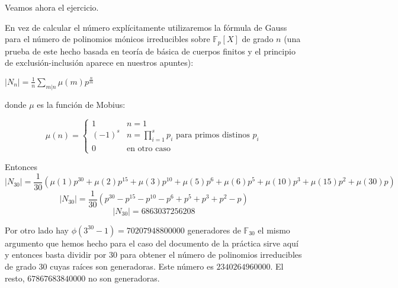 \documentclass{article}
\theoremstyle{theorem-style}  %
\theoremstyle{definition-style}
\theoremstyle{example-style}
\begin{document}
Veamos ahora el ejercicio. 

En vez de calcular el número explícitamente utilizaremos la fórmula de Gauss para el número de polinomios mónicos irreducibles sobre $\mathbb{F}_p[X]$ de grado $n$ (una prueba de este hecho basada en teoría de básica de cuerpos finitos y el principio de exclusión-inclusión aparece en nuestros apuntes):

$|N_n| = \frac{1}{n} \sum_{m|n} \mu(m) p^{\frac{n}{m}}$

donde $\mu$ es la función de Mobius:

	\[
	\mu(n) = 
	\begin{cases} 
	1 & n = 1 \\
	(-1)^s & n = \prod_{i = 1}^s p_i \text{ para primos distinos } p_i \\
	0   & \text{en otro caso}
	\end{cases}
	\]

Entonces $$|N_{30}| = \frac{1}{30}(\mu(1)p^{30} + \mu(2)p^{15}+\mu(3)p^{10}+\mu(5)p^6+\mu(6)p^5+\mu(10)p^3+\mu(15)p^2+\mu(30)p)$$ $$|N_{30}| = \frac{1}{30}(p^{30}-p^{15}-p^{10}-p^6+p^5+p^3+p^2-p)$$
$$|N_{30}| = 6863037256208$$

Por otro lado hay $\phi(3^{30} - 1) = 70207948800000$ generadores de $\mathbb{F}_{30}$ el mismo argumento que hemos hecho para el caso del documento de la práctica sirve aquí y entonces basta dividir por $30$ para obtener el número de polinomios irreducibles de grado 30 cuyas raíces son generadoras. Este número es $2340264960000$. El resto, $67867683840000$ no son generadoras. 


\printbibliography
\end{document}
